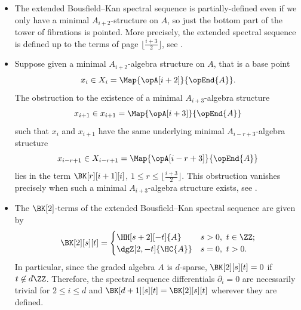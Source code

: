 \documentclass[a4paper]{amsart}
\newcounter{rpage}
\newcommand{\rpage}{\value{rpage}} 		%
\newcommand{\rescale}{0.3}			%
\newcommand{\margen}{0.1}			%
\newcommand{\abajo}{5}				%
\newcommand{\arriba}{5}
\newcommand{\derecha}{5} 			%
\begin{document}
\begin{itemize}
\begin{figure}[t]
    \caption{Range of definition of the extended Bousfield--Kan spectral
      sequence ($r=5$). The red region is where the classical Bousfield--Kan
      spectral sequence is defined; the extended spectral sequence is defined
      also in the blue region.}
    \label{fig:range_of_def}
  \end{figure}
\item The extended Bousfield--Kan spectral sequence is partially-defined even if
  we only have a minimal $A_{i+2}$-structure on $A$, so just the bottom part of the tower of fibrations is pointed. More precisely, the extended
  spectral sequence is defined up to the terms of page
  $\lfloor\frac{i+3}{2}\rfloor$, see \cite[Def.~5.1]{Mur20b}.
\item Suppose given a minimal $A_{i+2}$-algebra structure on $A$, that is a base point
  \[
    x_i\in X_i=\Map{\opA[i+2]}{\opEnd{A}}.
  \]
  The obstruction to the existence of a minimal $A_{i+3}$-algebra structure
  \[
    x_{i+1}\in x_{i+1}=\Map{\opA[i+3]}{\opEnd{A}}
  \]
  such that $x_i$ and $x_{i+1}$ have the same underlying minimal $A_{i-r+3}$-algebra
  structure
  \[
    x_{i-r+1}\in X_{i-r+1}=\Map{\opA[i-r+3]}{\opEnd{A}}
  \]
  lies in the term $\BK[r][i+1][i]$, $1\leq r\leq\lfloor\tfrac{i+3}{2}\rfloor$.
  This obstruction vanishes precisely when such a minimal $A_{i+3}$-algebra structure
  exists, see \cite[Prop.~5.4]{Mur20b}.
\item The $\BK[2]$-terms of the extended Bousfield--Kan spectral sequence are given
  by \cite[Cor.~6.3]{Mur20b}
  \[
    \BK[2][s][t]=\begin{cases}\HH[s+2][-t]{A}&s>0,\
      t\in\ZZ;\\\dgZ[2,-t]{\HC{A}}&s=0,\ t>0.\end{cases}
  \]
  In particular, since the graded algebra $A$ is $d$-sparse, $\BK[2][s][t]=0$ if
  $t\not\in d\ZZ$. Therefore, the spectral sequence differentials $\partial_{i}=0$ are necessarily trivial for $2\leq i\leq d$ and $\BK[d+1][s][t]=\BK[2][s][t]$ wherever they are defined.
\end{itemize}
\end{document}
